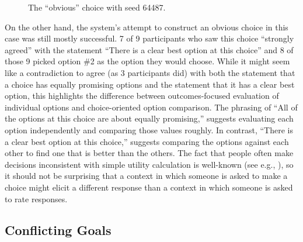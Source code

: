 \begin{figure}[!h]
\centering
{}
  \caption{The ``obvious'' choice with seed 64487.}
  \label{fig:ch64487}
\end{figure}


On the other hand, the system's attempt to construct an obvious choice in this case was still mostly successful.
%
7 of 9 participants who saw this choice ``strongly agreed'' with the statement ``There is a clear best option at this choice'' and 8 of those 9 picked option \#2 as the option they would choose.
%
While it might seem like a contradiction to agree (as 3 participants did) with both the statement that a choice has equally promising options and the statement that it has a clear best option, this highlights the difference between outcomes-focused evaluation of individual options and choice-oriented option comparison.
%
The phrasing of ``All of the options at this choice are about equally promising,'' suggests evaluating each option independently and comparing those values roughly.
%
In contrast, ``There is a clear best option at this choice,'' suggests comparing the options against each other to find one that is better than the others.
%
The fact that people often make decisions inconsistent with simple utility calculation is well-known (see e.g., \citep{Tversky1993}), so it should not be surprising that a context in which someone is asked to make a choice might elicit a different response than a context in which someone is asked to rate responses.


\subsection{Conflicting Goals}


